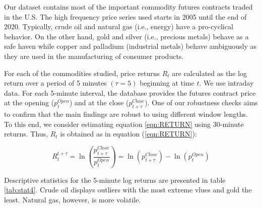 \documentclass[12pt]{article}
\begin{document}
Our dataset contains most of the important commodity futures contracts traded in the U.S. The high frequency price series used starts in 2005 until the end of 2020.
Typically, crude oil and natural gas (i.e., energy) have a pro-cyclical behavior. On the other hand, gold and silver (i.e., precious metals) behave as a safe haven while copper and palladium (industrial metals) behave ambiguously as they are used in the manufacturing of consumer products.


For each of the commodities studied, price returns $R_t$ are calculated as the log return over a period of 5 minutes $(\tau=5)$ beginning at time $t$. We use intraday data. For each 5-minute interval, the database provides the futures contract price at the opening ($p_{t}^{Open}$)  and at the close ($p_{t+\tau}^{Close}$). One of our robustness checks aims to confirm that the main findings are robust to using different window lengths. To this end, we consider estimating equation \ref{eqn:RETURN}  using 30-minute returns.  Thus, $R_t$ is obtained  as in equation (\ref{eqn:RETURN}):

\begin{equation}\label{eqn:RETURN}
R_t^{t+\tau}=\ln \left( \frac{p_{t+\tau}^{Close}}{p_{t}^{Open}} \right)=\ln (p_{t+\tau}^{Close})-\ln(p_{t}^{Open})
\end{equation}

Descriptive statistics for the 5-minute log returns are presented in table \ref{tab:stat4}. Crude oil displays  outliers with the most extreme vlues and gold the least. Natural gas, however, is more volatile. %

\end{document}
